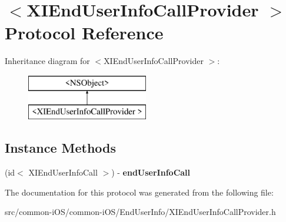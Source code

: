\hypertarget{protocol_x_i_end_user_info_call_provider_01-p}{}\section{$<$X\+I\+End\+User\+Info\+Call\+Provider $>$ Protocol Reference}
\label{protocol_x_i_end_user_info_call_provider_01-p}
Inheritance diagram for $<$X\+I\+End\+User\+Info\+Call\+Provider $>$\+:\begin{figure}[H]
\begin{center}
\leavevmode
\includegraphics[height=2.000000cm]{protocol_x_i_end_user_info_call_provider_01-p}
\end{center}
\end{figure}
\subsection*{Instance Methods}
\begin{DoxyCompactItemize}
\item 
\hypertarget{protocol_x_i_end_user_info_call_provider_01-p_a0f04501936d6411a6f3889d2ecc64afe}{}\label{protocol_x_i_end_user_info_call_provider_01-p_a0f04501936d6411a6f3889d2ecc64afe} 
(id$<$ X\+I\+End\+User\+Info\+Call $>$) -\/ {\bfseries end\+User\+Info\+Call}
\end{DoxyCompactItemize}


The documentation for this protocol was generated from the following file\+:\begin{DoxyCompactItemize}
\item 
src/common-\/i\+O\+S/common-\/i\+O\+S/\+End\+User\+Info/X\+I\+End\+User\+Info\+Call\+Provider.\+h\end{DoxyCompactItemize}
